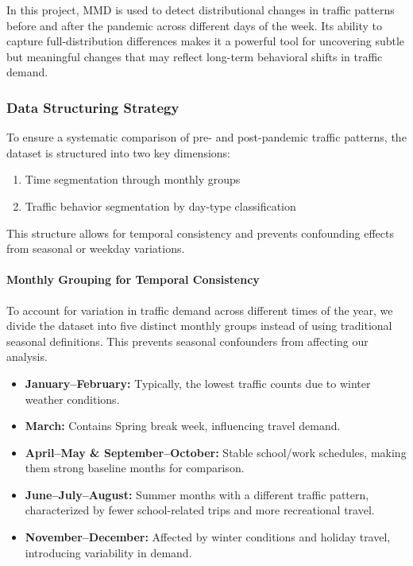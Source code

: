\documentclass{article}
\begin{document}
	In this project, MMD is used to detect distributional changes in traffic patterns before and after the pandemic across different days of the week. Its ability to capture full-distribution differences makes it a powerful tool for uncovering subtle but meaningful changes that may reflect long-term behavioral shifts in traffic demand.
\subsubsection{Data Structuring Strategy}

To ensure a systematic comparison of pre- and post-pandemic traffic patterns, the dataset is structured into two key dimensions:
\begin{enumerate}
    \item Time segmentation through monthly groups
    \item Traffic behavior segmentation by day-type classification
\end{enumerate}

This structure allows for temporal consistency and prevents confounding effects from seasonal or weekday variations.

\paragraph{Monthly Grouping for Temporal Consistency}

To account for variation in traffic demand across different times of the year, we divide the dataset into five distinct monthly groups instead of using traditional seasonal definitions. This prevents seasonal confounders from affecting our analysis.

\begin{itemize}
    \item \textbf{January–February:} Typically, the lowest traffic counts due to winter weather conditions.
    \item \textbf{March:} Contains Spring break week, influencing travel demand.
    \item \textbf{April–May \& September–October:} Stable school/work schedules, making them strong baseline months for comparison.
    \item \textbf{June–July–August:} Summer months with a different traffic pattern, characterized by fewer school-related trips and more recreational travel.
    \item \textbf{November–December:} Affected by winter conditions and holiday travel, introducing variability in demand.
\end{itemize}
\end{document}
